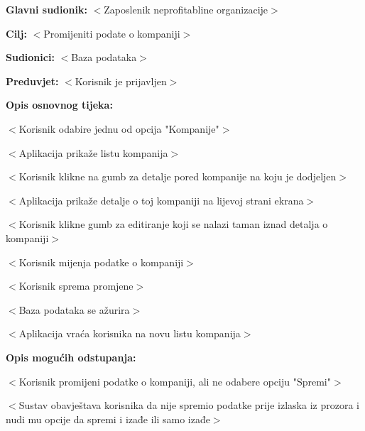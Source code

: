 					\noindent {}
					\begin{packed_item}

						\item \textbf{Glavni sudionik: }$<$Zaposlenik neprofitabline organizacije$>$
						\item  \textbf{Cilj:} $<$Promijeniti podate o kompaniji$>$
						\item  \textbf{Sudionici:} $<$Baza podataka$>$
						\item  \textbf{Preduvjet:} $<$Korisnik je prijavljen$>$
						\item  \textbf{Opis osnovnog tijeka:}

						\item[] \begin{packed_enum}

							\item $<$Korisnik odabire jednu od opcija "Kompanije"$>$
							\item $<$Aplikacija prikaže listu kompanija$>$
							\item $<$Korisnik klikne na gumb za detalje pored kompanije na koju je dodjeljen$>$
							\item $<$Aplikacija prikaže detalje o toj kompaniji na lijevoj strani ekrana$>$
							\item $<$Korisnik klikne gumb za editiranje koji se nalazi taman iznad detalja o kompaniji$>$
							\item $<$Korisnik mijenja podatke o kompaniji$>$
							\item $<$Korisnik sprema promjene$>$
							\item $<$Baza podataka se ažurira$>$
							\item $<$Aplikacija vraća korisnika na novu listu kompanija$>$
						\end{packed_enum}

						\item  \textbf{Opis mogućih odstupanja:}

						\item[] \begin{packed_item}

							\item[5.a] $<$Korisnik promijeni podatke o kompaniji, ali ne odabere opciju "Spremi"$>$
							\item[] \begin{packed_enum}

								\item $<$Sustav obavještava korisnika da nije spremio podatke prije izlaska
								iz prozora i nudi mu opcije da spremi i izađe ili samo izađe$>$


\end{packed_enum}
\end{packed_item}
\end{packed_item}

